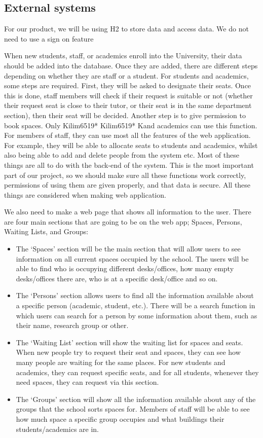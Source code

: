 \documentclass[11pt,a4paper]{article}
\begin{document}
\subsection*{\bf External systems}
For our product, we will be using H2 to store data and access data. We do not need to use a sign on feature 

When new students, staff, or academics enroll into the University, their data should be added into the database. Once they are added, there are different steps depending on whether they are staff or a student. For students and academics, some steps are required. First, they will be asked to designate their seats. Once this is done, staff members will check if their request is suitable or not (whether their request seat is close to their tutor, or their seat is in the same department section), then their seat will be decided. Another step is to give permission to book spaces. Only Kilim6519*
Kilim6519*
Kand academics can use this function. For members of staff, they can use most all the features of the web application. For example, they will be able to allocate seats to students and academics, whilst also being able to add and delete people from the system etc. Most of these things are all to do with the back-end of the system. This is the most important part of our project, so we should make sure all these functions work correctly, permissions of using them are given properly, and that data is secure. All these things are considered when making web application.
\bigskip

We also need to make a web page that shows all information to the user. There are four main sections that are going to be on the web app; Spaces, Persons, Waiting Lists, and Groups:

\begin{itemize}
    \item The ‘Spaces’ section will be the main section that will allow users to see information on all current spaces occupied by the school. The users will be able to find who is occupying different desks/offices, how many empty desks/offices there are, who is at a specific desk/office and so on.
    \item The ‘Persons’ section allows users to find all the information available about a specific person (academic, student, etc.). There will be a search function in which users can search for a person by some information about them, such as their name, research group or other.
    \item The ‘Waiting List’ section will show the waiting list for spaces and seats. When new people try to request their seat and spaces, they can see how many people are waiting for the same places. For new students and academics, they can request specific seats, and for all students, whenever they need spaces, they can request via this section.
    \item The ‘Groups’ section will show all the information available about any of the groups that the school sorts spaces for. Members of staff will be able to see how much space a specific group occupies and what buildings their students/academics are in.
\end{itemize}
\end{document}
